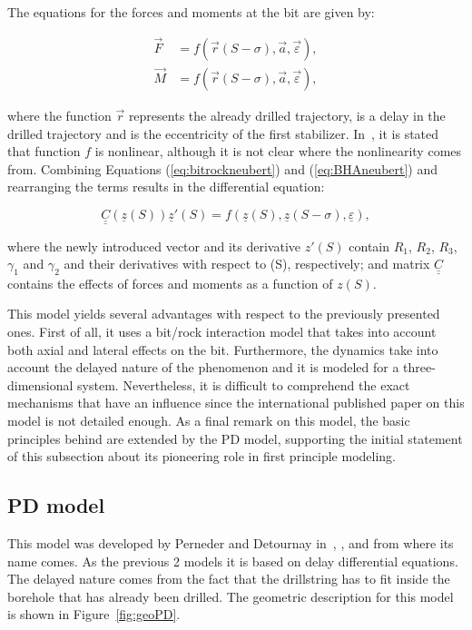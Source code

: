 The equations for the forces and moments at the bit are given by:

\begin{align}
\vec{F} &= f (\vec{r}(S-\sigma),\vec{a},\vec{\varepsilon}), \nonumber\\
\vec{M} &= f (\vec{r}(S-\sigma),\vec{a},\vec{\varepsilon}) ,
\label{eq:BHAneubert}
\end{align}

where the function $\vec{r}$ represents the already drilled trajectory,  is a delay in the drilled trajectory and  is the eccentricity of the first stabilizer. In~\cite{Neub97}, it is stated that function $f$ is nonlinear, although it is not clear where the nonlinearity comes from. Combining Equations (\ref{eq:bitrockneubert}) and (\ref{eq:BHAneubert}) and rearranging the terms results in the differential equation:

\begin{equation}
\underline{\underline{C}}(\underline{z}(S)) \underline{z}'(S) = f(\underline{z}(S), \underline{z}(S-\sigma), \underline{\varepsilon}),
\end{equation}

where the newly introduced vector  and its derivative $z'(S)$ contain $R_1$, $R_2$, $R_3$, $\gamma_1$ and $\gamma_2$ and their derivatives with respect to (S), respectively; and matrix $\underline{\underline{C}}$ contains the effects of forces and moments as a function of $z(S)$.

This model yields several advantages with respect to the previously presented ones. First of all, it uses a bit/rock interaction model that takes into account both axial and lateral effects on the bit. Furthermore, the dynamics take into account the delayed nature of the phenomenon and it is modeled for a three-dimensional system. Nevertheless, it is difficult to comprehend the exact mechanisms that have an influence since the international published paper on this model is not detailed enough. As a final remark on this model, the basic principles behind are extended by the PD model, supporting the initial statement of this subsection about its pioneering role in first principle modeling.


\subsection{PD model}\label{subsection:PD}
This model was developed by Perneder and Detournay in~\cite{Perneder2013}, \cite{Perneder2012}, \cite{Perneder2013a} and \cite{Perneder2013b} from where its name comes. As the previous 2 models it is based on delay differential equations. The delayed nature comes from the fact that the drillstring has to fit inside the borehole that has already been drilled. The geometric description for this model is shown in Figure~\ref{fig:geoPD}.

